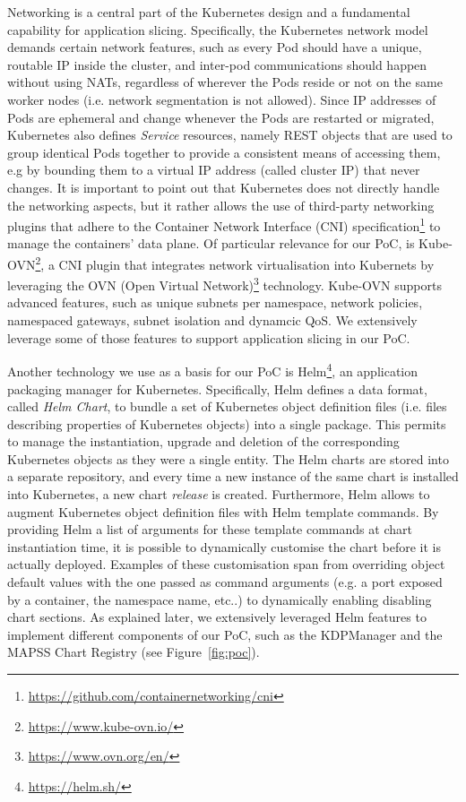 Networking is a central part of the Kubernetes design and a fundamental capability for application slicing. Specifically, the Kubernetes network model demands certain network features, such as every Pod should have a unique, routable IP inside the cluster, and inter-pod communications should happen without using NATs, regardless of wherever the Pods reside or not on the same worker nodes (i.e. network segmentation is not allowed). Since IP addresses of Pods are ephemeral and change whenever the Pods are restarted or migrated, Kubernetes also defines \textit{Service} resources, namely REST objects that are used to group identical Pods together to provide a consistent means of accessing them, e.g by bounding them to a virtual IP address (called cluster IP) that never changes. It is important to point out that 
Kubernetes does not directly handle the networking aspects, but it rather allows the use of third-party networking plugins that adhere to the Container Network Interface (CNI) specification\footnote{\url{https://github.com/containernetworking/cni}} to manage the containers' data plane. Of particular relevance for our PoC, is Kube-OVN\footnote{\url{https://www.kube-ovn.io/}}, a CNI plugin that integrates network virtualisation into Kubernets  by leveraging the OVN (Open Virtual Network)\footnote{\url{https://www.ovn.org/en/}} technology. Kube-OVN supports advanced features, such as unique subnets per namespace, network policies, namespaced gateways, subnet isolation and dynamcic QoS. We extensively leverage some of those features to support application slicing in our PoC. 

Another technology we use as a basis for our PoC is Helm\footnote{\url{https://helm.sh/}}, an application packaging manager for Kubernetes. Specifically, Helm defines a data format, called \textit{Helm Chart}, to bundle a set of Kubernetes object definition files (i.e. files describing properties of Kubernetes objects) into a single package. This permits to manage the instantiation, upgrade and deletion of the corresponding Kubernetes objects as they were a single entity. The Helm charts are stored into a separate repository, and every time a new instance of the same chart is installed into Kubernetes, a new chart \emph{release} is created. Furthermore, Helm allows to augment Kubernetes object definition files with Helm template commands. By providing Helm a list of arguments for these template commands at chart instantiation time, it is possible to dynamically customise the chart before it is actually deployed.  Examples of these customisation span from overriding object default values with the one passed as command arguments (e.g. a port exposed by a container, the namespace name, etc..) to dynamically enabling disabling chart sections. As explained later, we extensively leveraged Helm features to implement different components of our PoC, such as the KDPManager and the MAPSS Chart Registry (see Figure~\ref{fig:poc}).

